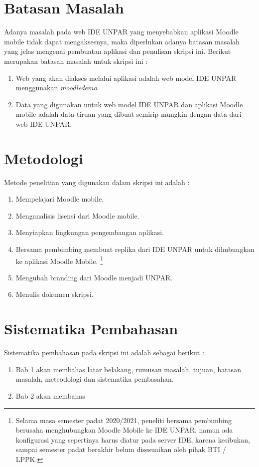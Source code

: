 \section{Batasan Masalah}
\label{sec:batasan}
Adanya masalah pada web IDE UNPAR yang menyebabkan aplikasi Moodle mobile tidak dapat mengaksesnya, maka diperlukan adanya batasan masalah yang jelas mengenai pembuatan aplikasi dan penulisan skripsi ini. Berikut merupakan batasan masalah untuk skripsi ini :
\begin{enumerate}
	\item Web yang akan diakses melalui aplikasi adalah web model IDE UNPAR menggunakan \textit{moodledemo}.
	\item Data yang digunakan untuk web model IDE UNPAR dan aplikasi Moodle mobile adalah data tiruan yang dibuat semirip mungkin dengan data dari web IDE UNPAR.
\end{enumerate}

\section{Metodologi}
\label{sec:metlit}
Metode penelitian yang digunakan dalam skripsi ini adalah :
\begin{enumerate}
		\item Mempelajari Moodle mobile.
		\item Menganalisis lisensi dari Moodle mobile.
		\item Menyiapkan lingkungan pengembangan aplikasi.
		\item Bersama pembimbing membuat replika dari IDE UNPAR untuk dihubungkan ke aplikasi Moodle Mobile. \footnote{Selama masa semester padat 2020/2021, peneliti bersama pembimbing berusaha menghubungkan Moodle Mobile ke IDE UNPAR, namun ada konfigurasi yang sepertinya harus diatur pada server IDE, karena kesibukan, sampai semester padat berakhir belum disesuaikan oleh pihak BTI / LPPK.}
		\item Mengubah branding dari Moodle menjadi UNPAR.
		\item Menulis dokumen skripsi.
\end{enumerate}

\section{Sistematika Pembahasan}
\label{sec:sispem}
 Sistematika pembahasan pada skripsi ini adalah sebagai berikut :
 \begin{enumerate}
 	\item Bab 1 akan membahas latar belakang, rumusan masalah, tujuan, batasan masalah, meteodologi dan sistematika pembasahan.
 	\item Bab 2 akan membahas 
 \end{enumerate}